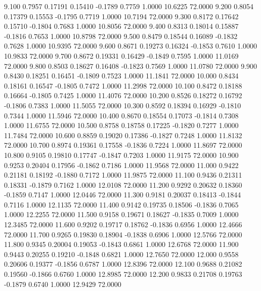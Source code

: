    9.100   0.7957   0.17191   0.15410  -0.1789   0.7759   1.0000  10.6225  72.0000
   9.200   0.8054   0.17379   0.15553  -0.1795   0.7719   1.0000  10.7194  72.0000
   9.300   0.8172   0.17642   0.15710  -0.1804   0.7683   1.0000  10.8056  72.0000
   9.400   0.8313   0.18014   0.15887  -0.1816   0.7653   1.0000  10.8798  72.0000
   9.500   0.8479   0.18544   0.16089  -0.1832   0.7628   1.0000  10.9395  72.0000
   9.600   0.8671   0.19273   0.16324  -0.1853   0.7610   1.0000  10.9833  72.0000
   9.700   0.8672   0.19331   0.16429  -0.1849   0.7595   1.0000  11.0169  72.0000
   9.800   0.8503   0.18627   0.16408  -0.1823   0.7569   1.0000  11.0780  72.0000
   9.900   0.8430   0.18251   0.16451  -0.1809   0.7523   1.0000  11.1841  72.0000
  10.000   0.8434   0.18161   0.16547  -0.1805   0.7472   1.0000  11.2998  72.0000
  10.100   0.8472   0.18188   0.16664  -0.1805   0.7425   1.0000  11.4076  72.0000
  10.200   0.8526   0.18272   0.16792  -0.1806   0.7383   1.0000  11.5055  72.0000
  10.300   0.8592   0.18394   0.16929  -0.1810   0.7344   1.0000  11.5946  72.0000
  10.400   0.8670   0.18554   0.17073  -0.1814   0.7308   1.0000  11.6755  72.0000
  10.500   0.8758   0.18758   0.17225  -0.1820   0.7277   1.0000  11.7484  72.0000
  10.600   0.8859   0.19020   0.17386  -0.1827   0.7248   1.0000  11.8132  72.0000
  10.700   0.8974   0.19361   0.17558  -0.1836   0.7224   1.0000  11.8697  72.0000
  10.800   0.9105   0.19810   0.17747  -0.1847   0.7203   1.0000  11.9175  72.0000
  10.900   0.9253   0.20404   0.17956  -0.1862   0.7186   1.0000  11.9568  72.0000
  11.000   0.9422   0.21181   0.18192  -0.1880   0.7172   1.0000  11.9875  72.0000
  11.100   0.9436   0.21311   0.18331  -0.1879   0.7162   1.0000  12.0108  72.0000
  11.200   0.9292   0.20632   0.18360  -0.1859   0.7147   1.0000  12.0446  72.0000
  11.300   0.9181   0.20037   0.18413  -0.1844   0.7116   1.0000  12.1135  72.0000
  11.400   0.9142   0.19735   0.18506  -0.1836   0.7065   1.0000  12.2255  72.0000
  11.500   0.9158   0.19671   0.18627  -0.1835   0.7009   1.0000  12.3485  72.0000
  11.600   0.9202   0.19717   0.18762  -0.1836   0.6956   1.0000  12.4666  72.0000
  11.700   0.9265   0.19830   0.18904  -0.1838   0.6906   1.0000  12.5766  72.0000
  11.800   0.9345   0.20004   0.19053  -0.1843   0.6861   1.0000  12.6768  72.0000
  11.900   0.9443   0.20255   0.19210  -0.1848   0.6821   1.0000  12.7650  72.0000
  12.000   0.9558   0.20606   0.19377  -0.1856   0.6787   1.0000  12.8396  72.0000
  12.100   0.9688   0.21082   0.19560  -0.1866   0.6760   1.0000  12.8985  72.0000
  12.200   0.9833   0.21708   0.19763  -0.1879   0.6740   1.0000  12.9429  72.0000
